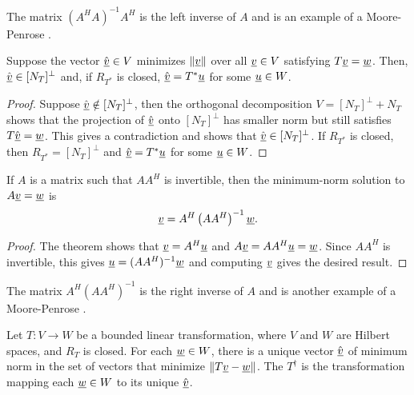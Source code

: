The matrix $\left( A^H A \right)^{-1} A^H$ is the left inverse of $A$ and is an example of a Moore-Penrose .

\begin{theorem}
Suppose the vector $\hat{\underline{v}} \in V$ minimizes $\| \underline{v} \|$ over all $\underline{v}\in V$ satisfying $T \underline{v} = \underline{w}$.
Then, $\hat{\underline{v}} \in [N_T]^{\bot}$ and, if $R_{T^*}$ is closed, $\hat{\underline{v}} = T^* \underline{u}$ for some $\underline{u}\in W$.
\end{theorem}
\begin{proof}
Suppose $\hat{\underline{v}} \notin [N_T]^{\bot}$, then the orthogonal decomposition $V = [N_T]^{\bot} + N_T$ shows that the projection of $\hat{\underline{v}}$ onto $[N_T]^{\bot}$ has smaller norm but still satisfies $T \hat{\underline{v}} = \underline{w}$.
This gives a contradiction and shows that $\hat{\underline{v}} \in [N_T]^{\bot}$.
If $R_{T^*}$ is closed, then $R_{T^*} = [N_T]^{\bot}$ and $\hat{\underline{v}} = T^* \underline{u}$ for some $\underline{u}\in W$.
\end{proof}

\begin{corollary}
If $A$ is a matrix such that $A A^H$ is invertible, then the minimum-norm solution to $A \underline{v} = \underline{w}$ is
\begin{equation*}
\underline{v} = A^H \left( A A^H \right)^{-1} \underline{w}.
\end{equation*}
\end{corollary}
\begin{proof}
The theorem shows that $\underline{v} = A^H \underline{u}$ and $A \underline{v} = A A^H \underline{u} = \underline{w}$.
Since $A A^H$ is invertible, this gives $\underline{u} = (A A^H)^{-1} \underline{w}$ and computing $\underline{v}$ gives the desired result.
\end{proof}

The matrix $A^H \left( A A^H \right)^{-1}$ is the right inverse of $A$ and is another example of a Moore-Penrose .

\begin{definition}
Let $T \colon V \rightarrow W$ be a bounded linear transformation, where $V$ and $W$ are Hilbert spaces, and $R_T$ is closed.
For each $\underline{w} \in W$, there is a unique vector $\hat{\underline{v}}$ of minimum norm in the set of vectors that minimize $\left\| T \underline{v} - \underline{w} \right\|$.
The  $T^{\dagger}$ is the transformation mapping each $\underline{w}\in W$ to its unique $\hat{\underline{v}}$.
\end{definition}
